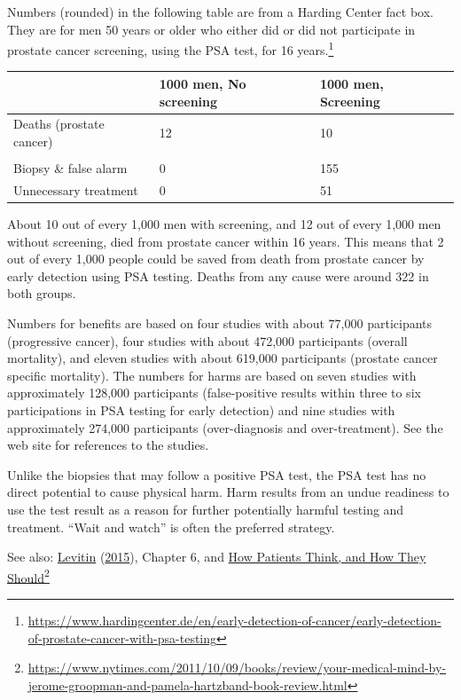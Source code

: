 \documentclass[
  10pt,
  b5paper]{book}
\begin{document}
Numbers (rounded) in the following table are from a Harding Center
fact box. They are for men 50 years or older who either did or did not
participate in prostate cancer screening, using the PSA test, for 16 years.\footnote{\url{https://www.hardingcenter.de/en/early-detection-of-cancer/early-detection-of-prostate-cancer-with-psa-testing}}

\begin{longtable}[]{@{}lll@{}}
\toprule
& 1000 men, No screening & 1000 men, Screening \\
\midrule
\endhead
Deaths (prostate cancer) & 12 & 10 \\
& & \\
Biopsy \& false alarm & 0 & 155 \\
Unnecessary treatment & 0 & 51 \\
\bottomrule
\end{longtable}

About 10 out of every 1,000 men with screening, and 12 out of every 1,000 men without screening, died from prostate cancer within 16 years. This means that 2 out of every 1,000 people could be saved from death from prostate cancer by early detection using PSA testing. Deaths from any cause were around 322 in both groups.

Numbers for benefits are based on four studies with about 77,000 participants (progressive cancer), four studies with about 472,000 participants (overall mortality), and eleven studies with about 619,000 participants (prostate cancer specific mortality). The numbers for harms are based on seven studies with approximately 128,000 participants (false-positive results within three to six participations in PSA testing for early detection) and nine studies with approximately 274,000 participants (over-diagnosis and over-treatment). See the web site for references to the studies.

Unlike the biopsies that may follow a positive PSA test, the PSA test has
no direct potential to cause physical harm. Harm results from an
undue readiness to use the test result as a reason for further
potentially harmful testing and treatment. ``Wait and watch'' is often
the preferred strategy.

See also: \protect\hyperlink{ref-levitin_2015}{Levitin} (\protect\hyperlink{ref-levitin_2015}{2015}), Chapter 6, and
\href{https://www.nytimes.com/2011/10/09/books/review/your-medical-mind-by-jerome-groopman-and-pamela-hartzband-book-review.html}{How Patients Think, and How They Should}\footnote{\url{https://www.nytimes.com/2011/10/09/books/review/your-medical-mind-by-jerome-groopman-and-pamela-hartzband-book-review.html}}
\end{document}
